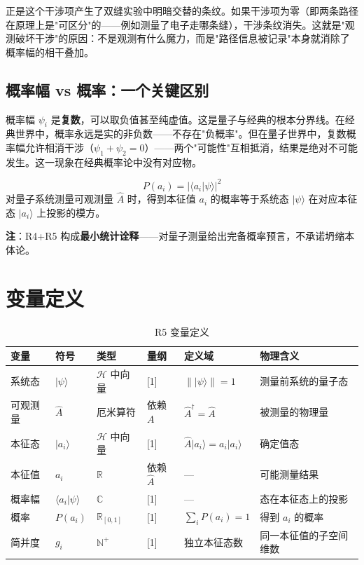 正是这个干涉项产生了双缝实验中明暗交替的条纹。如果干涉项为零（即两条路径在原理上是"可区分"的——例如测量了电子走哪条缝），干涉条纹消失。这就是"观测破坏干涉"的原因：不是观测有什么魔力，而是"路径信息被记录"本身就消除了概率幅的相干叠加。

\subsection{概率幅 vs 概率：一个关键区别}

概率幅 $\psi_i$ 是\textbf{复数}，可以取负值甚至纯虚值。这是量子与经典的根本分界线。在经典世界中，概率永远是实的非负数——不存在"负概率"。但在量子世界中，复数概率幅允许相消干涉（$\psi_1 + \psi_2 = 0$）——两个"可能性"互相抵消，结果是绝对不可能发生。这一现象在经典概率论中没有对应物。

\begin{principlebox}
  \[
  P(a_i) = |\langle a_i | \psi \rangle|^2
  \]
  对量子系统测量可观测量 $\hat{A}$ 时，得到本征值 $a_i$ 的概率等于系统态 $|\psi\rangle$ 在对应本征态 $|a_i\rangle$ 上投影的模方。

  \textbf{注}：R4+R5 构成\textbf{最小统计诠释}——对量子测量给出完备概率预言，不承诺坍缩本体论。
\end{principlebox}

\section{变量定义}

\begin{table}[h]
\centering
\small
\begin{tabular}{p{2.4cm}p{1.8cm}p{2cm}p{1.5cm}p{3cm}p{4cm}}
\toprule
\textbf{变量} & \textbf{符号} & \textbf{类型} & \textbf{量纲} & \textbf{定义域} & \textbf{物理含义} \\
\midrule
系统态 & $|\psi\rangle$ & $\mathcal{H}$ 中向量 & [1] & $\||\psi\rangle\|=1$ & 测量前系统的量子态 \\
可观测量 & $\hat{A}$ & 厄米算符 & 依赖 $A$ & $\hat{A}^\dagger = \hat{A}$ & 被测量的物理量 \\
本征态 & $|a_i\rangle$ & $\mathcal{H}$ 中向量 & [1] & $\hat{A}|a_i\rangle = a_i|a_i\rangle$ & 确定值态 \\
本征值 & $a_i$ & $\mathbb{R}$ & 依赖 $\hat{A}$ & — & 可能测量结果 \\
概率幅 & $\langle a_i|\psi\rangle$ & $\mathbb{C}$ & [1] & — & 态在本征态上的投影 \\
概率 & $P(a_i)$ & $\mathbb{R}_{[0,1]}$ & [1] & $\sum_i P(a_i)=1$ & 得到 $a_i$ 的概率 \\
简并度 & $g_i$ & $\mathbb{N}^+$ & [1] & 独立本征态数 & 同一本征值的子空间维数 \\
\bottomrule
\end{tabular}
\caption{R5 变量定义}
\end{table}

